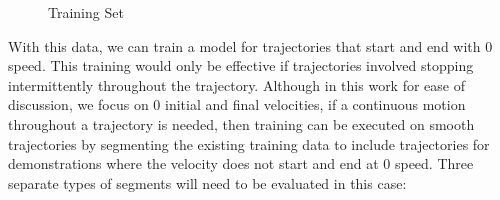 \documentclass[letterpaper, 10 pt, conference]{ieeeconf}  %
\newcommand\NB[1]{$\spadesuit$\footnote{NB: #1}}
\begin{document}
\begin{figure}[H]
	\centering
	\caption{Training Set}
	\label{fig:train}
\end{figure}
With this data, we can train a model for trajectories that start and end with $0$ speed. This training would only be effective if trajectories involved stopping intermittently throughout the trajectory. Although in this work for ease of discussion, we focus on $0$ initial and final velocities, if a continuous motion throughout a trajectory is needed, then training can be executed on smooth trajectories by segmenting the existing training data to include trajectories for demonstrations where the velocity does not start and end at $0$ speed. Three separate types of segments will need to be evaluated in this case:
\end{document}
